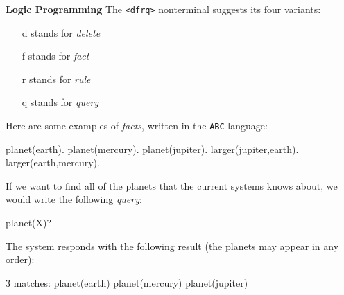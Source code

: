 \begin{minipage}[t]{\sw}
\slidenumber
\LARGE
{\bf Logic Programming}\exx
\Large
The \verb'<dfrq>' nonterminal suggests its four variants:
\begin{itemize}
\itemsep -0.1in
\item[d] stands for {\em delete}
\item[f] stands for {\em fact}
\item[r] stands for {\em rule}
\item[q] stands for {\em query}
\end{itemize}
Here are some examples of {\em facts}, written in the \verb'ABC' language:
\begin{qv}
planet(earth).
planet(mercury).
planet(jupiter).
larger(jupiter,earth).
larger(earth,mercury).
\end{qv}
If we want to find all of the planets that the current systems knows about,
we would write the following {\em query}:
\begin{qv}
planet(X)?
\end{qv}
The system responds with the following result
(the planets may appear in any order):
\begin{qv}
3 matches:
planet(earth)
planet(mercury)
planet(jupiter)
\end{qv}
\end{minipage}
